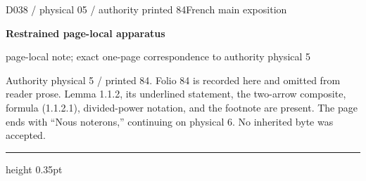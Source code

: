 \documentclass[9pt]{article}
\newcommand{\CanonText}[1]{\par{\fontsize{8.0}{9.35}\selectfont\RaggedRight #1\par}\vspace{2.2pt}}
\newcommand{\LayerTitle}{Restrained page-local apparatus}
\begin{document}
\noindent\begin{minipage}[t][\dimexpr\textheight-5pt\relax][t]{\textwidth}
{\sffamily\fontsize{7.3}{8.2}\selectfont\color{Quiet} D038 / physical 05 / authority printed 84\hfill French main exposition}
\par{}\vspace{4.5pt}
{\sffamily\fontsize{10.4}{11.6}\selectfont\bfseries\color{Accent} \LayerTitle}
\par{\sffamily\fontsize{6.7}{7.7}\selectfont\color{Quiet} page-local note; exact one-page correspondence to authority physical 5}
\vspace{5pt}
\CanonText{Authority physical 5 / printed 84. Folio 84 is recorded here and omitted from reader prose. Lemma 1.1.2, its underlined statement, the two-arrow composite, formula (1.1.2.1), divided-power notation, and the footnote are present. The page ends with “Nous noterons,” continuing on physical 6. No inherited byte was accepted.}
\vfill
{\color{Accent}\hrule height 0.35pt}\vspace{3pt}
\end{minipage}
\newpage
\end{document}
